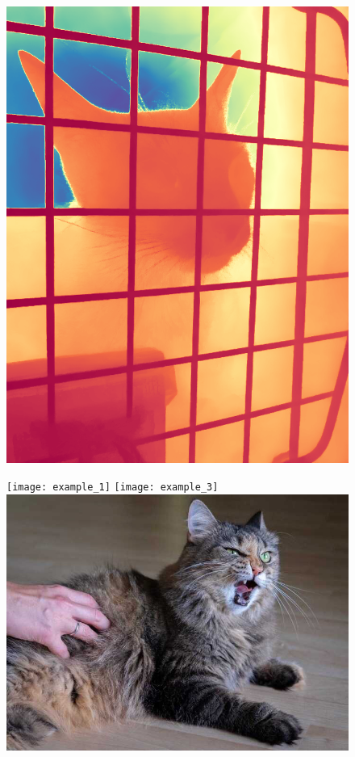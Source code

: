 \documentclass[12pt, letterpaper]{article}
\begin{document}
\begin{figure}[!ht]
\begin{minipage}{0.22\textwidth}
        \includegraphics[width=\textwidth]{example_6_pred_colored}
    \end{minipage}
    \begin{minipage}{0.22\textwidth}
        \texttt{[image: example\_1]}
        \texttt{[image: example\_3]}
        \includegraphics[width=\textwidth]{example_5}

\end{minipage}
\end{figure}
\end{document}
